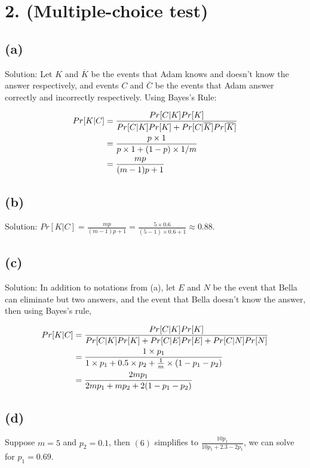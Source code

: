 \documentclass[10pt]{537homework}
\author{Peilun Dai}
\begin{document}
\section*{2. (Multiple-choice test) }

\subsection*{(a)} Solution: Let $K$ and $\overline{K}$ be the events that Adam knows and doesn't know the answer respectively, and events $C$ and $\overline{C}$ be the events that Adam answer correctly and incorrectly respectively. Using Bayes's Rule: 

\begin{align}
	Pr[K|C] & =  \frac{Pr[C|K]Pr[K]}{Pr[C|K]Pr[K] + {Pr[C|\overline{K}]Pr[\overline{K}]}} \\
	& = {p \times 1 \over p \times 1 + (1-p)\times 1/m} \\
	& =  {mp \over (m-1)p + 1} 
\end{align}

\subsection*{(b)} Solution: $Pr[K|C] = \frac{mp}{(m-1)p + 1} = \frac{5\times 0.6}{(5-1)\times 0.6 + 1} \approx 0.88$. 

\subsection*{(c)} Solution: In addition to notations from (a), let $E$ and $N$ be the event that Bella can eliminate but two answers, and the event that Bella doesn't know the answer, then using Bayes's rule,

\begin{align}
	Pr[K|C] & =  \frac{Pr[C|K]Pr[K]}{Pr[C|K]Pr[K] + Pr[C|E]Pr[E] + Pr[C|N]Pr[N]} \\
	& = \frac{1\times p_1}{1\times p_1 + 0.5 \times p_2 + {1\over m} \times (1-p_1 -p_2)} \\
	& =  \frac{2mp_1}{2mp_1 + mp_2 + 2(1-p_1 - p_2)} 
\end{align}

\subsection*{(d)} Suppose $m=5$ and $p_2=0.1$, then $(6)$ simplifies to $\frac{10p_1}{10p_1 + 2.3-2p_1}$, we can solve for $p_1 = 0.69$. 
\end{document}
